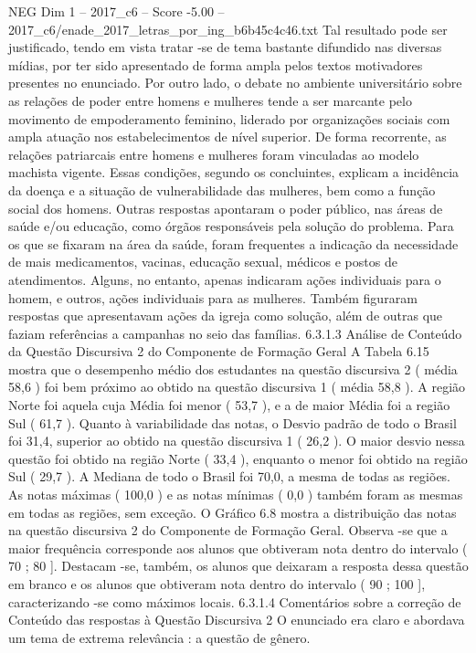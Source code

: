 \begin{textsample}{NEG Dim 1 – 2017\_c6 – Score -5.00 – 2017\_c6/enade\_2017\_letras\_por\_ing\_b6b45c4c46.txt}
Tal resultado pode ser justificado, tendo em vista tratar -se de tema bastante difundido nas diversas mídias, por ter sido apresentado de forma ampla pelos textos motivadores presentes no enunciado.
Por outro lado, o debate no ambiente universitário sobre as relações de poder entre homens e mulheres tende a ser marcante pelo movimento de empoderamento feminino, liderado por organizações sociais com ampla atuação nos estabelecimentos de nível superior.
De forma recorrente, as relações patriarcais entre homens e mulheres foram vinculadas ao modelo machista vigente.
Essas condições, segundo os concluintes, explicam a incidência da doença e a situação de vulnerabilidade das mulheres, bem como a função social dos homens.
Outras respostas apontaram o poder público, nas áreas de saúde e/ou educação, como órgãos responsáveis pela solução do problema.
Para os que se fixaram na área da saúde, foram frequentes a indicação da necessidade de mais medicamentos, vacinas, educação sexual, médicos e postos de atendimentos.
Alguns, no entanto, apenas indicaram ações individuais para o homem, e outros, ações individuais para as mulheres.
Também figuraram respostas que apresentavam ações da igreja como solução, além de outras que faziam referências a campanhas no seio das famílias. 6.3.1.3 Análise de Conteúdo da Questão Discursiva 2 do Componente de Formação Geral A Tabela 6.15 mostra que o desempenho médio dos estudantes na questão discursiva 2 ( média 58,6 ) foi bem próximo ao obtido na questão discursiva 1 ( média 58,8 ).
A região Norte foi aquela cuja Média foi menor ( 53,7 ), e a de maior Média foi a região Sul ( 61,7 ).
Quanto à variabilidade das notas, o Desvio padrão de todo o Brasil foi 31,4, superior ao obtido na questão discursiva 1 ( 26,2 ).
O maior desvio nessa questão foi obtido na região Norte ( 33,4 ), enquanto o menor foi obtido na região Sul ( 29,7 ).
A Mediana de todo o Brasil foi 70,0, a mesma de todas as regiões.
As notas máximas ( 100,0 ) e as notas mínimas ( 0,0 ) também foram as mesmas em todas as regiões, sem exceção.
O Gráfico 6.8 mostra a distribuição das notas na questão discursiva 2 do Componente de Formação Geral.
Observa -se que a maior frequência corresponde aos alunos que obtiveram nota dentro do intervalo ( 70 ; 80 ].
Destacam -se, também, os alunos que deixaram a resposta dessa questão em branco e os alunos que obtiveram nota dentro do intervalo ( 90 ; 100 ], caracterizando -se como máximos locais. 6.3.1.4 Comentários sobre a correção de Conteúdo das respostas à Questão Discursiva 2 O enunciado era claro e abordava um tema de extrema relevância : a questão de gênero.

\end{textsample}

